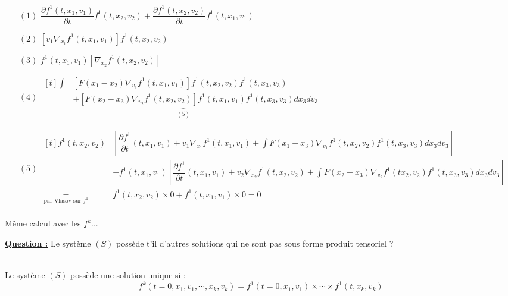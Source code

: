 \documentclass[12pt,a4paper]{article}
\begin{document}
	\hspace{-1cm}\begin{minipage}[t]{20cm}
		\begin{enumerate}
		\item[$(1)$] $\dfrac{\partial f^1(t,x_1,v_1)}{\partial t}  f^1(t,x_2,v_2) + \dfrac{\partial f^1(t,x_2,v_2)}{\partial t}f^1(t,x_1,v_1)$\\
		
		\item[$(2)$] $\left[v_1\nabla_{x_1}f^1(t,x_1,v_1)\right]f^1(t,x_2,v_2)$\\
		
		\item[$(3)$] $f^1(t,x_1,v_1)\left[\nabla_{x_2}f^1(t,x_2,v_2)\right]$\\
		
		\item[$(4)$] $\begin{aligned}[t]
			\displaystyle\int
			&\left[F(x_1-x_2)\nabla_{v_1}f^1(t,x_1,v_1)\right]f^1(t,x_2,v_2)f^1(t,x_3,v_3) \\
			&\underbrace{+ \left[F(x_2-x_3)\nabla_{v_2}f^1(t,x_2,v_2)\right]f^1(t,x_1,v_1)f^1(t,x_3,v_3)}_{(5)}dx_3dv_3
		\end{aligned}$
		
		\item[$(5)$] \hspace{-.5cm}$\begin{aligned}[t]
			f^1(t,x_2,v_2)&	\left[\dfrac{\partial f^1}{\partial t}(t,x_1,v_1) + v_1\nabla_{x_1}f^1(t,x_1,v_1) + \displaystyle\int F(x_1-x_3)\nabla_{v_1}f^1(t,x_2,v_2)f^1(t,x_3,v_3) dx_3dv_ 3\right] \\
			&+ f^1(t,x_1,v_1)\left[\dfrac{\partial f^1}{\partial t}(t,x_1,v_1) + v_2\nabla_{x_2}f^1(t,x_2,v_2) + \displaystyle\int F(x_2-x_3)\nabla_{v_2}f^1(tx_2,v_2)f^1(t,x_3,v_3)dx_3dv_3\right]\\
			\underset{\text{par Vlasov sur }f^1}{=}
			&f^1(t,x_2,v_2)\times 0 + f^1(t,x_1,v_1) \times 0 = 0\\
		\end{aligned}$
	\end{enumerate}
	\end{minipage}

	
	Même calcul avec les $f^k$...
	
	\textbf{\underline{Question :}} Le système $(S)$ possède t'il d'autres solutions qui ne sont pas sous forme produit tensoriel ?
	
	\begin{thm} $ $\\
		Le système $(S)$ possède une solution unique si :
		\[f^k(t=0,x_1,v_1,\cdots,x_k,v_k) = f^1(t=0,x_1,v_1)\times\cdots\times f^1(t,x_k,v_k)\]
	\end{thm}
	
\end{document}
